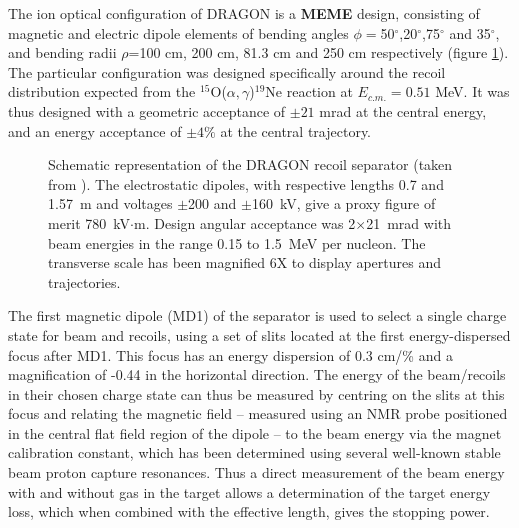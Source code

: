 The ion optical configuration of DRAGON is a {\bf MEME} design, consisting of magnetic and electric  dipole elements of bending angles $\phi=$50$^{\circ}$,20$^{\circ}$,75$^{\circ}$ and 35$^{\circ}$, and bending radii $\rho$=100 cm, 200 cm, 81.3 cm and 250 cm respectively (figure \ref{fig:dra_optics}). The particular configuration was designed specifically around the recoil distribution expected from the $^{15}$O($\alpha ,\gamma$)$^{19}$Ne reaction at $E_{c.m.}=0.51$ MeV. It was thus designed with a geometric acceptance of $\pm21$ mrad at the central energy, and an energy acceptance of $\pm4\%$ at the central trajectory. 
\begin{figure}
\begin{center}
\caption{Schematic representation of the DRAGON recoil separator (taken from \cite{hut03}). The electrostatic dipoles, with respective lengths 0.7 and 1.57~m and voltages $\pm$200 and $\pm$160~kV, give a proxy figure of merit 780~kV$\cdot$m.  Design angular acceptance was 2$\times$21~mrad with beam energies in the range 0.15 to 1.5~MeV per nucleon. The transverse scale has been magnified 6X to display apertures and trajectories.}
\label{fig:dra_optics}
\end{center}
\end{figure}

The first magnetic dipole (MD1) of the separator is used to select a single charge state for beam and recoils, using a set of slits located at the first energy-dispersed focus after MD1. This focus has an energy dispersion of 0.3 cm/\% and a magnification of -0.44 in the horizontal direction. The energy of the beam/recoils in their chosen charge state can thus be measured by centring on the slits at this focus and relating the magnetic field -- measured using an NMR probe positioned in the central flat field region of the dipole -- to the beam energy via the magnet calibration constant, which has been determined using several well-known stable beam proton capture resonances. Thus a direct measurement of the beam energy with and without gas in the target allows a determination of the target energy loss, which when combined with the effective length, gives the stopping power. 


